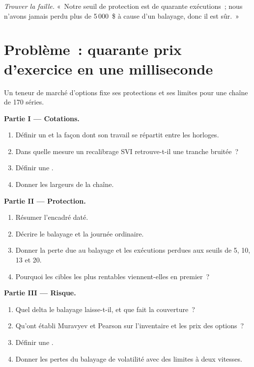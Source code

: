 \begin{exercise}[$\star\star\star$]\label{exo:hf:automated-options-market-making:8}
\emph{Trouver la faille.} «~Notre seuil de protection est de quarante exécutions~; nous n'avons jamais perdu plus de 5\,000~\$ à cause d'un balayage, donc il est sûr.~»
\end{exercise}

\section{Problème~: quarante prix d'exercice en une milliseconde}

\begin{problem}\label{pb:hf:automated-options-market-making:1}
Un teneur de marché d'options fixe ses protections et ses limites pour une chaîne de 170 séries.

\medskip\noindent\textbf{Partie I --- Cotations.}
\begin{enumerate}
\item Définir un  et la façon dont son travail se répartit entre les horloges.
\item Dans quelle mesure un recalibrage SVI retrouve-t-il une tranche bruitée~?
\item Définir une .
\item Donner les largeurs de la chaîne.
\end{enumerate}

\medskip\noindent\textbf{Partie II --- Protection.}
\begin{enumerate}[resume]
\item Résumer l'encadré daté.
\item Décrire le balayage et la journée ordinaire.
\item Donner la perte due au balayage et les exécutions perdues aux seuils de 5, 10, 13 et 20.
\item Pourquoi les cibles les plus rentables viennent-elles en premier~?
\end{enumerate}

\medskip\noindent\textbf{Partie III --- Risque.}
\begin{enumerate}[resume]
\item Quel delta le balayage laisse-t-il, et que fait la couverture~?
\item Qu'ont établi Muravyev et Pearson sur l'inventaire et les prix des options~?
\item Définir une .
\item Donner les pertes du balayage de volatilité avec des limites à deux vitesses.
\end{enumerate}


\end{problem}
